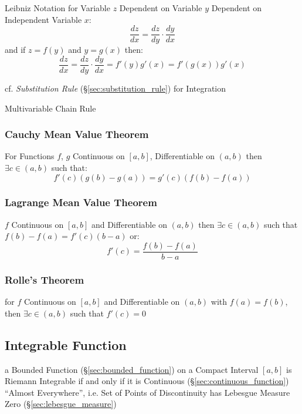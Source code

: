 Leibniz Notation for Variable $z$ Dependent on Variable $y$ Dependent on
Independent Variable $x$:
\[
  \frac{dz}{dx} = \frac{dz}{dy} \cdot \frac{dy}{dx}
\]
and if $z = f(y)$ and $y = g(x)$ then:
\[
  \frac{dz}{dx} = \frac{dz}{dy} \cdot \frac{dy}{dx}
    = f'(y)g'(x) = f'(g(x))g'(x)
\]

\fist cf. \emph{Substitution Rule} (\S\ref{sec:substitution_rule}) for
Integration

Multivariable Chain Rule



\subsubsection{Cauchy Mean Value Theorem}
\label{sec:cauchy_mean_value}

For Functions $f$, $g$ Continuous on $[a,b]$, Differentiable on
$(a,b)$ then $\exists c \in (a,b)$ such that:
\[
  f'(c) (g(b) - g(a)) = g'(c) (f(b) - f(a))
\]



\subsubsection{Lagrange Mean Value Theorem}
\label{sec:lagrange_mean_value}

$f$ Continuous on $[a,b]$ and Differentiable on $(a,b)$ then $\exists
c \in (a,b)$ such that $f(b) - f(a) = f'(c)(b-a)$ or:
\[
  f'(c) = \frac{f(b) - f(a)}{b - a}
\]



\subsubsection{Rolle's Theorem}\label{sec:rolles_theorem}

for $f$ Continuous on $[a,b]$ and Differentiable on $(a,b)$ with $f(a)
= f(b)$, then $\exists c \in (a,b)$ such that $f'(c) = 0$



\subsection{Integrable Function}\label{sec:integrable_function}


a Bounded Function (\S\ref{sec:bounded_function}) on a Compact Interval $[a,b]$
is Riemann Integrable if and only if it is Continuous
(\S\ref{sec:continuous_function}) ``Almost Everywhere'', i.e. Set of Points of
Discontinuity has Lebesgue Measure Zero (\S\ref{sec:lebesgue_measure})


